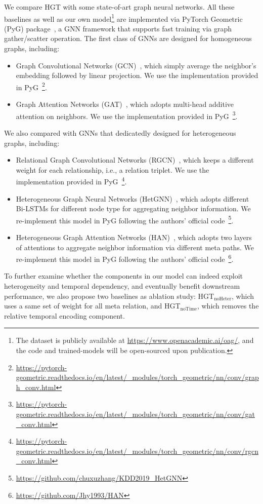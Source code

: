 \documentclass[sigconf]{acmart}
\theoremstyle{definition}
\begin{document}
{We compare HGT with some state-of-art graph neural networks. All these baselines as well as our own model\footnote{The dataset is publicly available at \url{https://www.openacademic.ai/oag/}, and the code and trained-models will be open-sourced upon publication.} are implemented via PyTorch Geometric (PyG) package~\cite{pyG}, a GNN framework that supports fast training via graph gather/scatter operation. The first class of GNNs are designed for homogeneous graphs, including:
\begin{itemize}
    \item Graph Convolutional Networks (GCN)~\cite{gcn}, which simply average the neighbor's embedding followed by linear projection. We use the implementation provided in PyG~\footnote{\url{https://pytorch-geometric.readthedocs.io/en/latest/_modules/torch_geometric/nn/conv/graph_conv.html}}.
    \item Graph Attention Networks (GAT)~\cite{gat}, which adopts multi-head additive attention on neighbors. We use the implementation provided in PyG~\footnote{\url{https://pytorch-geometric.readthedocs.io/en/latest/_modules/torch_geometric/nn/conv/gat_conv.html}}. 
\end{itemize}
We also compared with GNNs that dedicatedly designed for heterogeneous graphs, including:
\begin{itemize}
    \item Relational Graph Convolutional Networks (RGCN)~\cite{DBLP:conf/esws/SchlichtkrullKB18}, which keeps a different weight for each relationship, i.e., a relation triplet. We use the implementation provided in PyG~\footnote{\url{https://pytorch-geometric.readthedocs.io/en/latest/_modules/torch_geometric/nn/conv/rgcn_conv.html}}.
    \item Heterogeneous Graph Neural Networks (HetGNN)~\cite{DBLP:conf/kdd/ZhangSHSC19}, which adopts different Bi-LSTMs for different node type for aggregating neighbor information. We re-implement this model in PyG following the authors' official code~\footnote{\url{https://github.com/chuxuzhang/KDD2019_HetGNN}}.
    \item Heterogeneous Graph Attention Networks (HAN)~\cite{DBLP:conf/www/WangJSWYCY19}, which adopts two layers of attentions to aggregate neighbor information via different meta paths. We re-implement this model in PyG following the authors' official code~\footnote{\url{https://github.com/Jhy1993/HAN}}.
\end{itemize}

To further examine whether the components in our model can indeed exploit heterogeneity and temporal dependency, and eventually benefit downstream performance, we also propose two baselines as ablation study:  HGT$_{\text{noHeter}}$, which uses a same set of weight for all meta relation, and HGT$_{\text{noTime}}$, which removes the relative temporal encoding component. 

}
\end{document}
